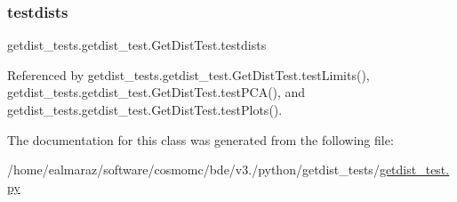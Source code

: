 \subsubsection{\texorpdfstring{testdists}{testdists}}
{\footnotesize\ttfamily getdist\+\_\+tests.\+getdist\+\_\+test.\+Get\+Dist\+Test.\+testdists}



Referenced by getdist\+\_\+tests.\+getdist\+\_\+test.\+Get\+Dist\+Test.\+test\+Limits(), getdist\+\_\+tests.\+getdist\+\_\+test.\+Get\+Dist\+Test.\+test\+P\+C\+A(), and getdist\+\_\+tests.\+getdist\+\_\+test.\+Get\+Dist\+Test.\+test\+Plots().



The documentation for this class was generated from the following file\+:\begin{DoxyCompactItemize}
\item 
/home/ealmaraz/software/cosmomc/bde/v3./python/getdist\+\_\+tests/\mbox{\hyperlink{getdist__test_8py}{getdist\+\_\+test.\+py}}\end{DoxyCompactItemize}
